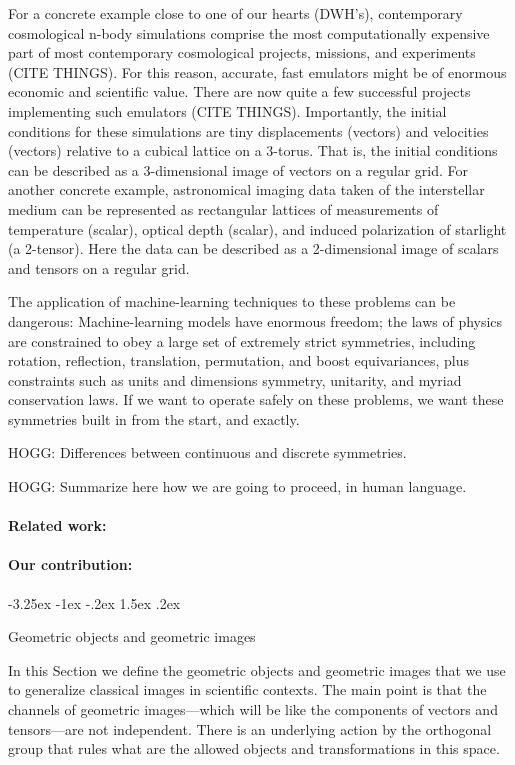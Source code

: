 \documentclass{article}
\makeatletter
\theoremstyle{plain}
\newcommand{\sectionname}{Section}
\renewcommand\section{\@startsection {section}{1}{\z@}%
  {-3.25ex \@plus -1ex \@minus -.2ex}%
  {1.5ex \@plus .2ex}%
  {\raggedright\normalfont\large\bfseries}}
\makeatother
\begin{document}
For a concrete example close to one of our hearts (DWH's), contemporary cosmological n-body simulations comprise the most computationally expensive part of most contemporary cosmological projects, missions, and experiments (CITE THINGS).
For this reason, accurate, fast emulators might be of enormous economic and scientific value.
There are now quite a few successful projects implementing such emulators (CITE THINGS).
Importantly, the initial conditions for these simulations are tiny displacements (vectors) and velocities (vectors) relative to a cubical lattice on a 3-torus.
That is, the initial conditions can be described as a 3-dimensional image of vectors on a regular grid.
For another concrete example, astronomical imaging data taken of the interstellar medium can be represented as rectangular lattices of measurements of temperature (scalar), optical depth (scalar), and induced polarization of starlight (a 2-tensor).
Here the data can be described as a 2-dimensional image of scalars and tensors on a regular grid.

The application of machine-learning techniques to these problems can be dangerous:
Machine-learning models have enormous freedom; the laws of physics are constrained to obey a large set of extremely strict symmetries, including rotation, reflection, translation, permutation, and boost equivariances, plus constraints such as units and dimensions symmetry, unitarity, and myriad conservation laws.
If we want to operate safely on these problems, we want these symmetries built in from the start, and exactly.

HOGG: Differences between continuous and discrete symmetries.

HOGG: Summarize here how we are going to proceed, in human language.

\paragraph{Related work:}

\paragraph{Our contribution:}

\section{Geometric objects and geometric images}\label{sec:geometric}

In this \sectionname{} we define the geometric objects and geometric images that we use to generalize classical images in scientific contexts.
The main point is that the channels of geometric images---which will be like the components of vectors and tensors---are not independent.
There is an underlying action by the orthogonal group that rules what are the allowed objects and transformations in this space.
\end{document}
